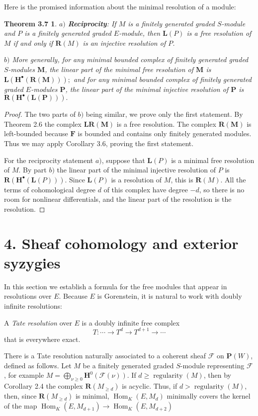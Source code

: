 \documentclass{tran-l}
\newcommand{\reg}{\operatorname{regularity}}
\newcommand{\myHom}{\operatorname{Hom}}
\newcommand{\F}{\mathcal{F}}
\newcommand{\FF}{\mathbf{F}}
\newcommand{\myH}{\mathbf{H}}
\newcommand{\LL}{\mathbf{L}}
\newcommand{\MM}{\mathbf{M}}
\newcommand{\myP}{\mathbf{P}}
\newcommand{\PP}{\mathbf{P}}
\newcommand{\RR}{\mathbf{R}}
\theoremstyle{plain}
\newtheorem*{theorem15}{Theorem 3.7}
\theoremstyle{remark}
\theoremstyle{definition}
\begin{document}
Here is the promised information about the minimal resolution of a module:
\begin{theorem15}
$a)$ {\bf Reciprocity}: If $M$ is a finitely
generated graded $S$-module and $P$ is a finitely generated graded
$E$-module, then $\LL (P)$ is a free resolution of $M$
if and only if $\RR (M)$ is an injective resolution of $P$.

$ b)$ More generally, for any minimal
bounded complex of finitely generated
graded $S$-modules $\MM $, the linear part of the minimal
free resolution of $\MM $ is
$\LL (\myH ^{\bullet }(\RR (\MM )));
$
and
for any minimal bounded complex of finitely generated
graded $E$-modules $\PP $,
the linear part of the minimal injective resolution of $\PP $
is
$\RR (\myH ^{\bullet }(\LL (\PP ))).
$
\end{theorem15}
\begin{proof} 
The two parts of $b)$ being
similar, we prove only the first statement. By Theorem 2.6
the complex $\LL \RR (\MM )$ is a free resolution. The complex
$\RR (\MM )$ is left-bounded because $\FF $ is bounded and contains
only finitely generated modules. Thus we may apply
Corollary 3.6, proving the first statement.

For the reciprocity statement $a)$, suppose that $\LL (P)$ is a minimal free
resolution of
$M$. By part $b)$ the linear part of the minimal
injective resolution of $P$ is $\RR (\myH ^{\bullet }(\LL (P)))$. Since
$\LL (P)$ is a resolution of $M$, this is $\RR (M)$. All the
terms of cohomological degree $d$ of this complex have degree $-d$,
so there is no room for nonlinear differentials, and the linear part
of the resolution is the resolution. \end{proof}


\section*{4. Sheaf cohomology and exterior syzygies}

In this section we establish a formula for the free
modules that appear in resolutions over $E$.
Because $E$ is Gorenstein, it is
natural to work with doubly infinite resolutions:

A {\em Tate resolution\/} over $E$ is a doubly infinite free
complex
\begin{equation*}T: \cdots \to T^{d}\to T^{d+1}\to \cdots \end{equation*}
that is everywhere exact.

There is a Tate resolution naturally associated to a
coherent sheaf $\F $
on $\myP (W)$, defined as follows. Let
$M$ be a finitely generated graded
$S$-module representing $\F $,
for example $M=\bigoplus _{\nu \geq 0}\myH ^{0}(\F (\nu ))$.
If $d\geq \reg (M)$, then by Corollary 2.4
the complex $\RR (M_{\geq d})$ is acyclic. Thus,
if $d>\reg (M)$, then, since $\RR (M_{\geq d})$ is minimal,
$\myHom _{K}(E,M_{d})$ minimally covers
the kernel of the map $\myHom _{K}(E,M_{d+1})\to \myHom _{K}(E,M_{d+2})$
\end{document}
